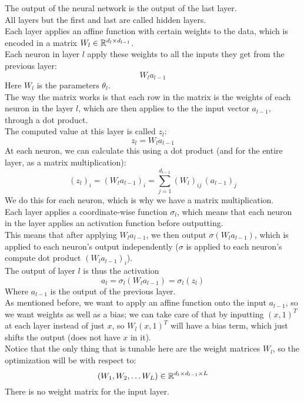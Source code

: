 \documentclass[12pt]{article}
\begin{document}
The output of the neural network is the output of 
the last layer. \\

All layers but the first and last are called hidden
layers. \\

Each layer applies an affine function with certain
weights to the data, which is encoded in
a matrix $W_l \in \mathbb{R}^{d_l \times d_{l-1}}$. \\
Each neuron in layer $l$ apply these weights to all the
inputs they get from the previous layer: 
\[ W_l a_{l-1} \]
Here $W_l$ is the parameters $\theta_l$. \\
The way the matrix works is that each row in the
matrix is the weights of each neuron in the layer $l$,
which are then applies to the the input vector $a_{l-1}$,
through a dot product. \\
The computed value at this layer is called $z_l$:
\[ z_l  = W_l a_{l-1} \]
At each neuron, we can calculate this
using a dot product (and for the entire layer,
as a matrix multiplication):
\[ (z_l)_i = (W_l a_{l-1})_i = \sum_{j=1}^{d_{l-1}}
(W_l)_{ij} \, (a_{l-1})_j \]
We do this for each neuron, which is why we have a
matrix multiplication. \\

Each layer applies a coordinate-wise
function $\sigma_l$,
which means that each neuron in the layer applies
an activation function before outputting. \\
This means that after applying $W_l a_{l-1}$,
we then output $\sigma(W_l a_{l-1})$,
which is applied to each neuron's output independently
($\sigma$ is applied to each
neuron's compute dot product $(W_l a_{l-1})_i$). \\

The output of layer $l$ is thus the activation
\[ a_l = \sigma_l(W_l a_{l -1}) = \sigma_l(z_l) \]
Where $a_{l-1}$ is the output of the previous layer. \\

As mentioned before, we want to apply an affine function
onto the input $a_{l-1}$, so we want weights as well
as a bias; we can take care of that by
inputting $(x, 1)^T$ at each layer instead of just $x$,
so $W_l (x, 1)^T$ will have a bias term,
which just shifts the output (does not have $x$
in it). \\

Notice that the only thing that is tunable here are
the weight matrices $W_l$, so the optimization
will be with respect to:
\[ (W_1, W_2, \dots W_L) \in 
\mathbb{R}^{d_l \times d_{l-1} \times L} \]
There is no weight matrix for the input layer. \\
\end{document}
